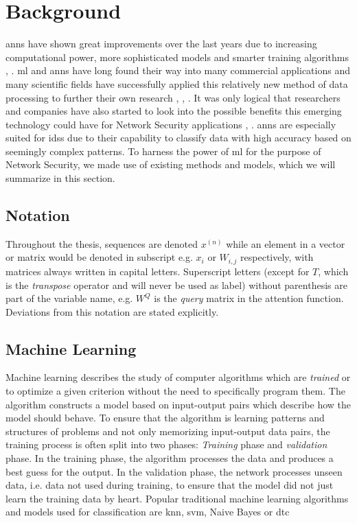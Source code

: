 \chapter{Background} \label{sec:background}

\glspl{ann} have shown great improvements over the last years due to increasing computational power, more sophisticated models and smarter training algorithms \cite{reboot_acgan}, \cite{unsupervised_learning_video_segmentation}. \gls{ml} and \glspl{ann} have long found their way into many commercial applications and many scientific fields have successfully applied this relatively new method of data processing to further their own research \cite{alpha_fold}, \cite{ai_medicine}, \cite{ai_antibiotic}. It was only logical that researchers and companies have also started to look into the possible benefits this emerging technology could have for Network Security applications \cite{kitsune}, \cite{ml_ids_survey}. \glspl{ann} are especially suited for \glspl{ids} due to their capability to classify data with high accuracy based on seemingly complex patterns. To harness the power of \gls{ml} for the purpose of Network Security, we made use of existing methods and models, which we will summarize in this section.

\section{Notation} \label{sec:background:terminology:notation}

Throughout the thesis, sequences are denoted $x^{(n)}$ while an element in a vector or matrix would be denoted in subscript e.g. $x_i$ or $W_{i,j}$ respectively, with matrices always written in capital letters. Superscript letters (except for $T$, which is the \textit{transpose} operator and will never be used as label) without parenthesis are part of the variable name, e.g. $W^Q$ is the \textit{query} matrix in the attention function. Deviations from this notation are stated explicitly.

\section{Machine Learning} \label{sec:background:ml}

Machine learning describes the study of computer algorithms which are \textit{trained} or  to optimize a given criterion without the need to specifically program them. The algorithm constructs a model based on input-output pairs which describe how the model should behave.
To ensure that the algorithm is learning patterns and structures of problems and not only memorizing input-output data pairs, the training process is often split into two phases: \textit{Training} phase and \textit{validation} phase. In the training phase, the algorithm processes the data and produces a best guess for the output. In the validation phase, the network processes unseen data, i.e. data not used during training, to ensure that the model did not just learn the training data by heart. 
Popular traditional machine learning algorithms and models used for classification are \gls{knn}, \gls{svm}, Naive Bayes or \gls{dtc}
\par

